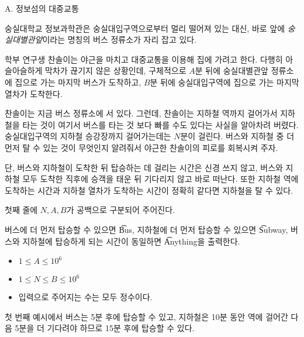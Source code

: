 \def\probtitle{정보섬의 대중교통}
\def\probno{A}

\begin{problem}{\probno{}. \probtitle{}}

숭실대학교 정보과학관은 숭실대입구역으로부터 멀리 떨어져 있는 대신, 바로 앞에 \textit{숭실대별관앞}이라는 명칭의 버스 정류소가 자리 잡고 있다.

학부 연구생 찬솔이는 야근을 마치고 대중교통을 이용해 집에 가려고 한다. 다행히 아슬아슬하게 막차가 끊기지 않은 상황인데, 구체적으로 $A$분 뒤에 숭실대별관앞 정류소에 집으로 가는 마지막 버스가 도착하고, $B$분 뒤에 숭실대입구역에 집으로 가는 마지막 열차가 도착한다.

찬솔이는 지금 버스 정류소에 서 있다. 그런데, 찬솔이는 지하철 역까지 걸어가서 지하철을 타는 것이 여기서 버스를 타는 것 보다 빠를 수도 있다는 사실을 알아차려 버렸다. 숭실대입구역의 지하철 승강장까지 걸어가는데는 $N$분이 걸린다. 버스와 지하철 중 더 먼저 탈 수 있는 것이 무엇인지 알려줘서 야근한 찬솔이의 피로를 회복시켜 주자.

단, 버스와 지하철이 도착한 뒤 탑승하는 데 걸리는 시간은 신경 쓰지 않고, 버스와 지하철 모두 도착한 직후에 승객을 태운 뒤 기다리지 않고 바로 떠난다. 또한 지하철 역에 도착하는 시간과 지하철 열차가 도착하는 시간이 정확히 같다면 지하철을 탈 수 있다.

\InputFile

첫째 줄에 $N, A, B$가 공백으로 구분되어 주어진다.

\OutputFile

버스에 더 먼저 탑승할 수 있으면 \t{Bus}, 지하철에 더 먼저 탑승할 수 있으면 \t{Subway}, 버스와 지하철에 탑승하게 되는 시간이 동일하면 \t{Anything}을 출력한다.

\Constraints

\begin{itemize}[noitemsep]
    \item $1 \leq A \leq 10^6$
    \item $1 \leq N \leq B \leq 10^6$
    \item 입력으로 주어지는 수는 모두 정수이다.
\end{itemize}

\Example

\begin{example}
\end{example}

첫 번째 예시에서 버스는 5분 후에 탑승할 수 있고, 지하철은 10분 동안 역에 걸어간 다음 5분을 더 기다려야 하므로 15분 후에 탑승할 수 있다.




\end{problem}